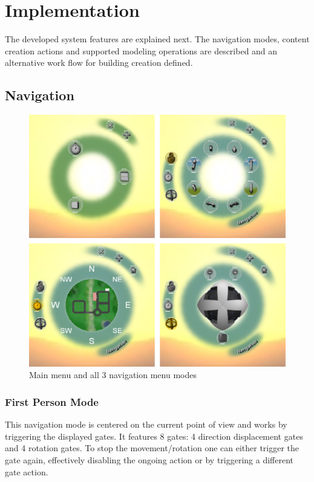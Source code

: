 \chapter{Implementation}


The developed system features are explained next. The navigation modes, content creation actions
and supported modeling operations are described and an alternative work flow for building creation defined.


\section{Navigation}


\begin{figure}[ht]
	\centering
		\includegraphics[scale=0.5]{gfx/main-nav-menus.png}
	\caption{Main menu and all 3 navigation menu modes}
	\label{fig:main-nav-menus}
\end{figure}


\subsection{First Person Mode}

This navigation mode is centered on the current point of view and works by triggering the displayed gates.
It features 8 gates: 4 direction displacement gates and 4 rotation gates.
To stop the movement/rotation one can either trigger the gate again, effectively disabling the ongoing action
or by triggering a different gate action.

